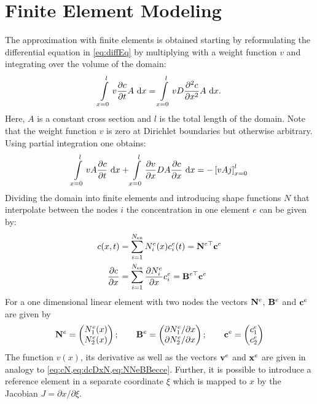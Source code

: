 \section{Finite Element Modeling}
  The approximation with finite elements is obtained starting by reformulating the differential equation in \cref{eq:diffEq} by multiplying with a weight function $v$ and integrating over the volume of the domain:
  \begin{equation}
    \intl v \dcDt A \ \dx = \intl v D \ddcDDx A \ \dx.
  \end{equation}
  Here, $A$ is a constant cross section and $l$ is the total length of the domain.  Note that the weight function $v$ is zero at Dirichlet boundaries but otherwise arbitrary. Using partial integration one obtains:
  \begin{equation}
    \begin{split}
    \int\displaylimits_{x=0}^{l} v A \frac{\partial c}{\partial t} \ {\rm d} x + \int\displaylimits_{x=0}^{l} \frac{\partial v}{\partial x} D A \frac{\partial c}{\partial x} \ {\rm d} x=  - \left[ v A j \right]_{x=0}^{l}
    \end{split}
    \label{eq:weakForm}
  \end{equation}
  Dividing the domain into finite elements and introducing shape functions $N$ that interpolate between the nodes $i$ the concentration in one element $e$ can be given by:
  \begin{align}
    c(x,t) &= \sum_{i=1}^{N_{\rm en}} N_i^e(x) c_i^e(t) = {{\bf{N}}}^{e \top} {\bf{c}}^e \label{eq:cN}\\
    \frac{\partial c}{\partial x} &= \sum_{i=1}^{N_{\rm en}} \frac{\partial N_i^e}{\partial x} c_i^e= {{\bf{B}}}^{e \top} {\bf{c}}^e
    \label{eq:dcDxN}
  \end{align}
 For a one dimensional linear element with two nodes the vectors ${\bf{N}}^e$, ${\bf{B}}^e$ and ${\bf{c}}^e$ are given by
  \begin{equation}
    {\bf{N}}^e = \begin{pmatrix} N_1^e(x) \\ N_2^e(x) \end{pmatrix}; \qquad 
    {\bf{B}}^e = \begin{pmatrix} \partial N_1^e / \partial x \\ \partial N_2^e / \partial x \end{pmatrix}; \qquad 
    {\bf{c}}^e = \begin{pmatrix} c_1^e \\ c_2^e \end{pmatrix}
    \label{eq:NNeBBecce}
  \end{equation}
  The function $v(x)$, its derivative as well as the vectors ${\bf{v}}^e$ and ${\bf{x}}^e$ are given in analogy to \cref{eq:cN,eq:dcDxN,eq:NNeBBecce}. Further, it is possible to introduce a reference element in a separate coordinate $\xi$ which is mapped to $x$ by the Jacobian \mbox{$J=\partial x / \partial \xi$}.
